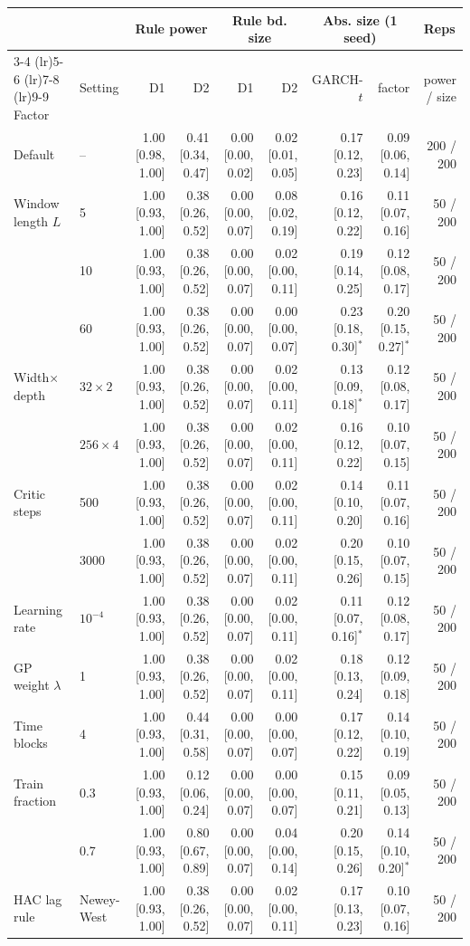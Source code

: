 \begin{tabular}{llrrrrrrr}
\toprule
 &  & \multicolumn{2}{c}{Rule power} & \multicolumn{2}{c}{Rule bd. size} & \multicolumn{2}{c}{Abs. size (1 seed)} & \multicolumn{1}{c}{Reps} \\
\cmidrule(lr){3-4} \cmidrule(lr){5-6} \cmidrule(lr){7-8} \cmidrule(lr){9-9}
Factor & Setting & D1 & D2 & D1 & D2 & GARCH-$t$ & factor & power / size \\
\midrule
Default & -- & 1.00 [0.98, 1.00] & 0.41 [0.34, 0.47] & 0.00 [0.00, 0.02] & 0.02 [0.01, 0.05] & 0.17 [0.12, 0.23] & 0.09 [0.06, 0.14] & 200 / 200 \\
Window length $L$ & 5 & 1.00 [0.93, 1.00] & 0.38 [0.26, 0.52] & 0.00 [0.00, 0.07] & 0.08 [0.02, 0.19] & 0.16 [0.12, 0.22] & 0.11 [0.07, 0.16] & 50 / 200 \\
 & 10 & 1.00 [0.93, 1.00] & 0.38 [0.26, 0.52] & 0.00 [0.00, 0.07] & 0.02 [0.00, 0.11] & 0.19 [0.14, 0.25] & 0.12 [0.08, 0.17] & 50 / 200 \\
 & 60 & 1.00 [0.93, 1.00] & 0.38 [0.26, 0.52] & 0.00 [0.00, 0.07] & 0.00 [0.00, 0.07] & 0.23 [0.18, 0.30]$^\ast$ & 0.20 [0.15, 0.27]$^\ast$ & 50 / 200 \\
Width$\times$depth & $32\times2$ & 1.00 [0.93, 1.00] & 0.38 [0.26, 0.52] & 0.00 [0.00, 0.07] & 0.02 [0.00, 0.11] & 0.13 [0.09, 0.18]$^\ast$ & 0.12 [0.08, 0.17] & 50 / 200 \\
 & $256\times4$ & 1.00 [0.93, 1.00] & 0.38 [0.26, 0.52] & 0.00 [0.00, 0.07] & 0.02 [0.00, 0.11] & 0.16 [0.12, 0.22] & 0.10 [0.07, 0.15] & 50 / 200 \\
Critic steps & 500 & 1.00 [0.93, 1.00] & 0.38 [0.26, 0.52] & 0.00 [0.00, 0.07] & 0.02 [0.00, 0.11] & 0.14 [0.10, 0.20] & 0.11 [0.07, 0.16] & 50 / 200 \\
 & 3000 & 1.00 [0.93, 1.00] & 0.38 [0.26, 0.52] & 0.00 [0.00, 0.07] & 0.02 [0.00, 0.11] & 0.20 [0.15, 0.26] & 0.10 [0.07, 0.15] & 50 / 200 \\
Learning rate & $10^{-4}$ & 1.00 [0.93, 1.00] & 0.38 [0.26, 0.52] & 0.00 [0.00, 0.07] & 0.02 [0.00, 0.11] & 0.11 [0.07, 0.16]$^\ast$ & 0.12 [0.08, 0.17] & 50 / 200 \\
GP weight $\lambda$ & 1 & 1.00 [0.93, 1.00] & 0.38 [0.26, 0.52] & 0.00 [0.00, 0.07] & 0.02 [0.00, 0.11] & 0.18 [0.13, 0.24] & 0.12 [0.09, 0.18] & 50 / 200 \\
Time blocks & 4 & 1.00 [0.93, 1.00] & 0.44 [0.31, 0.58] & 0.00 [0.00, 0.07] & 0.00 [0.00, 0.07] & 0.17 [0.12, 0.22] & 0.14 [0.10, 0.19] & 50 / 200 \\
Train fraction & 0.3 & 1.00 [0.93, 1.00] & 0.12 [0.06, 0.24] & 0.00 [0.00, 0.07] & 0.00 [0.00, 0.07] & 0.15 [0.11, 0.21] & 0.09 [0.05, 0.13] & 50 / 200 \\
 & 0.7 & 1.00 [0.93, 1.00] & 0.80 [0.67, 0.89] & 0.00 [0.00, 0.07] & 0.04 [0.00, 0.14] & 0.20 [0.15, 0.26] & 0.14 [0.10, 0.20]$^\ast$ & 50 / 200 \\
HAC lag rule & Newey-West & 1.00 [0.93, 1.00] & 0.38 [0.26, 0.52] & 0.00 [0.00, 0.07] & 0.02 [0.00, 0.11] & 0.17 [0.13, 0.23] & 0.10 [0.07, 0.16] & 50 / 200 \\
\bottomrule
\end{tabular}
